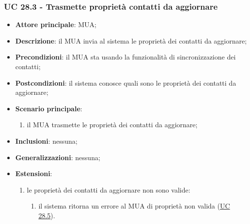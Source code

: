     \subsubsection{UC 28.3 - Trasmette proprietà contatti da aggiornare} \label{sec:UC28.3}
    \begin{itemize}
        \item \textbf{Attore principale}: MUA;
        \item \textbf{Descrizione}: il MUA invia al sistema le proprietà dei contatti da aggiornare;
        \item \textbf{Precondizioni}: il MUA sta usando la funzionalità di sincronizzazione dei contatti;
        \item \textbf{Postcondizioni}: il sistema conosce quali sono le proprietà dei contatti da aggiornare;
        \item \textbf{Scenario principale}:
            \begin{enumerate}
                \item il MUA trasmette le proprietà dei contatti da aggiornare;
            \end{enumerate}
        \item \textbf{Inclusioni}: nessuna;
        \item \textbf{Generalizzazioni}: nessuna;
        \item \textbf{Estensioni}:
            \begin{enumerate}[label=\alph*.]
                \item le proprietà dei contatti da aggiornare non sono valide:
                \begin{enumerate}[label=\arabic*.]
                    \item il sistema ritorna un errore al MUA di proprietà non valida (\hyperref[sec:UC28.5]{UC 28.5}).
                \end{enumerate}
            \end{enumerate}
    \end{itemize}



